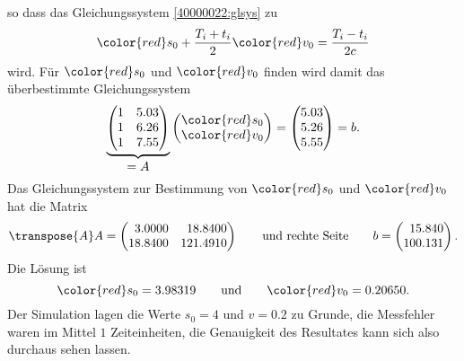 \begin{loesung}
\[\]
so dass das Gleichungssystem \eqref{40000022:glsys}
zu 
\begin{equation}
{\color{red}s_0} + \frac{T_i+t_i}{2} {\color{red}v_0}
=
\frac{T_i-t_i}{2c}
\label{40000022:glsys2}
\end{equation}
wird.
Für 
$\color{red}s_0$
und
$\color{red}v_0$
finden wird damit das überbestimmte Gleichungssystem
\[
\underbrace{
\begin{pmatrix}
1&5.03\\
1&6.26\\
1&7.55
\end{pmatrix}
}_{\displaystyle=A}
\begin{pmatrix}
\color{red}s_0\\
\color{red}v_0
\end{pmatrix}
=
\begin{pmatrix}
5.03\\
5.26\\
5.55
\end{pmatrix}
=
b.
\]
Das Gleichungssystem zur Bestimmung von $\color{red}s_0$ und $\color{red}v_0$
hat die Matrix
\[
\transpose{A}A
=
\begin{pmatrix}
\phantom{0}3.0000&\phantom{0}18.8400\\
          18.8400&          121.4910
\end{pmatrix}
\qquad
\text{und rechte Seite}
\qquad
b
=
\begin{pmatrix}
   \phantom{0}15.840\\
             100.131
\end{pmatrix}.
\]
Die Lösung ist
\[
{\color{red}s_0} =    3.98319
\qquad\text{und}\qquad
{\color{red}v_0} =   0.20650.
\]
Der Simulation lagen die Werte $s_0=4$ und $v=0.2$ zu Grunde, die Messfehler
waren im Mittel $1$ Zeiteinheiten, die Genauigkeit des Resultates kann sich
also durchaus sehen lassen.
\end{loesung}

